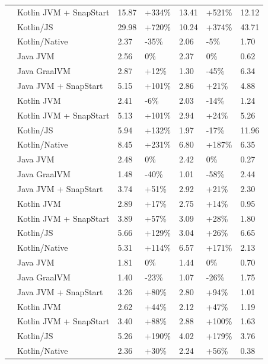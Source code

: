 \begin{table}[htbp]
\begin{tabular}{|>{\centering\arraybackslash}m{2cm}|l|p{1.5cm}|p{1.5cm}|p{1.5cm}|p{1.5cm}|p{1.5cm}|}
 & Kotlin JVM + SnapStart & 15.87 & \mbox{+334\%} & 13.41 & \mbox{+521\%} & 12.12 \\
 & Kotlin/JS & 29.98 & \mbox{+720\%} & 10.24 & \mbox{+374\%} & 43.71 \\
 & Kotlin/Native & 2.37 & \mbox{-35\%} & 2.06 & \mbox{-5\%} & 1.70 \\
\midrule
\multirow{7}{*}{512} & Java JVM & 2.56 & \mbox{0\%} & 2.37 & \mbox{0\%} & 0.62 \\
 & Java GraalVM & 2.87 & \mbox{+12\%} & 1.30 & \mbox{-45\%} & 6.34 \\
 & Java JVM + SnapStart & 5.15 & \mbox{+101\%} & 2.86 & \mbox{+21\%} & 4.88 \\
 & Kotlin JVM & 2.41 & \mbox{-6\%} & 2.03 & \mbox{-14\%} & 1.24 \\
 & Kotlin JVM + SnapStart & 5.13 & \mbox{+101\%} & 2.94 & \mbox{+24\%} & 5.26 \\
 & Kotlin/JS & 5.94 & \mbox{+132\%} & 1.97 & \mbox{-17\%} & 11.96 \\
 & Kotlin/Native & 8.45 & \mbox{+231\%} & 6.80 & \mbox{+187\%} & 6.35 \\
\midrule
\multirow{7}{*}{1024} & Java JVM & 2.48 & \mbox{0\%} & 2.42 & \mbox{0\%} & 0.27 \\
 & Java GraalVM & 1.48 & \mbox{-40\%} & 1.01 & \mbox{-58\%} & 2.44 \\
 & Java JVM + SnapStart & 3.74 & \mbox{+51\%} & 2.92 & \mbox{+21\%} & 2.30 \\
 & Kotlin JVM & 2.89 & \mbox{+17\%} & 2.75 & \mbox{+14\%} & 0.95 \\
 & Kotlin JVM + SnapStart & 3.89 & \mbox{+57\%} & 3.09 & \mbox{+28\%} & 1.80 \\
 & Kotlin/JS & 5.66 & \mbox{+129\%} & 3.04 & \mbox{+26\%} & 6.65 \\
 & Kotlin/Native & 5.31 & \mbox{+114\%} & 6.57 & \mbox{+171\%} & 2.13 \\
\midrule
\multirow{7}{*}{2048} & Java JVM & 1.81 & \mbox{0\%} & 1.44 & \mbox{0\%} & 0.70 \\
 & Java GraalVM & 1.40 & \mbox{-23\%} & 1.07 & \mbox{-26\%} & 1.75 \\
 & Java JVM + SnapStart & 3.26 & \mbox{+80\%} & 2.80 & \mbox{+94\%} & 1.01 \\
 & Kotlin JVM & 2.62 & \mbox{+44\%} & 2.12 & \mbox{+47\%} & 1.19 \\
 & Kotlin JVM + SnapStart & 3.40 & \mbox{+88\%} & 2.88 & \mbox{+100\%} & 1.63 \\
 & Kotlin/JS & 5.26 & \mbox{+190\%} & 4.02 & \mbox{+179\%} & 3.76 \\
 & Kotlin/Native & 2.36 & \mbox{+30\%} & 2.24 & \mbox{+56\%} & 0.38 \\
\bottomrule
\end{tabular}
\label{table:warm_start_comparison}
\end{table}

